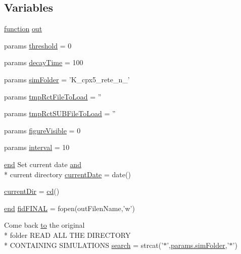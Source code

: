 \subsection*{Variables}
\begin{DoxyCompactItemize}
\item 
\hyperlink{a00062_a4b4c670b101bf7a838f775e008fa6255}{function} \hyperlink{a00022_a34c820385e9209f49c18739329ad9206}{out}
\item 
params \hyperlink{a00022_aa022cbb28f80299d572def08e7a5ccfd}{threshold} = 0
\item 
params \hyperlink{a00022_abd7ce2c4bf5f563b1e70731f58e8c57d}{decay\-Time} = 100
\item 
params \hyperlink{a00022_a0ffb8131632b48d9111c3a27d91262e2}{sim\-Folder} = 'K\-\_\-cpx5\-\_\-rete\-\_\-n\-\_\-'
\item 
params \hyperlink{a00022_a3b01c97f207a2997c3bd0c2718441509}{tmp\-Rct\-File\-To\-Load} = ''
\item 
params \hyperlink{a00022_ae5d21adddbfe36d5b10d43a2e8b39123}{tmp\-Rct\-S\-U\-B\-File\-To\-Load} = ''
\item 
params \hyperlink{a00022_a0eef57d24680b0a2e17d81a50229e3cb}{figure\-Visible} = 0
\item 
params \hyperlink{a00022_a4d8f56ee83b9b4dbe17b218746a1768c}{interval} = 10
\item 
\hyperlink{a00019_afb358f48b1646c750fb9da6c6585be2b}{end} Set current date \hyperlink{a00022_a170f8acb213f91bf71c77b1d20bceb33}{and} \\*
current directory \hyperlink{a00022_a54768c0405781065cb2f7a16ab8e7d31}{current\-Date} = date()
\item 
\hyperlink{a00022_af32eb97339f1e9d37b5540de2cbc79c9}{current\-Dir} = \hyperlink{a00065_abe327856a9ee2f30f3ccafe4dc9edf5e}{cd}()
\item 
\hyperlink{a00019_afb358f48b1646c750fb9da6c6585be2b}{end} \hyperlink{a00022_a2f1bf22f6a0c3f5791577061e92c0433}{fid\-F\-I\-N\-A\-L} = fopen(out\-Filen\-Name,'w')
\item 
Come back \hyperlink{a00022_af71dbe52628a3f83a77ab494817525c6}{to} the original \\*
folder R\-E\-A\-D A\-L\-L T\-H\-E D\-I\-R\-E\-C\-T\-O\-R\-Y \\*
C\-O\-N\-T\-A\-I\-N\-I\-N\-G S\-I\-M\-U\-L\-A\-T\-I\-O\-N\-S \hyperlink{a00022_ab3186e0326a3b47b2cfcb5577ab5139f}{search} = strcat('$\ast$',\hyperlink{a00026_aa671e3345005bd599e662bcaa115b18a}{params.\-sim\-Folder},'$\ast$')
\item 

\end{DoxyCompactItemize}
